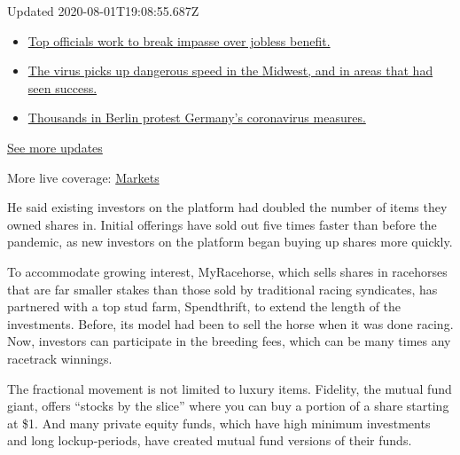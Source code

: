 Updated 2020-08-01T19:08:55.687Z

\begin{itemize}
\tightlist
\item
  \href{https://www.nytimes3xbfgragh.onion/2020/08/01/world/coronavirus-covid-19.html?action=click\&pgtype=Article\&state=default\&region=MAIN_CONTENT_1\&context=storylines_live_updates\#link-3ac56579}{Top
  officials work to break impasse over jobless benefit.}
\item
  \href{https://www.nytimes3xbfgragh.onion/2020/08/01/world/coronavirus-covid-19.html?action=click\&pgtype=Article\&state=default\&region=MAIN_CONTENT_1\&context=storylines_live_updates\#link-8796723}{The
  virus picks up dangerous speed in the Midwest, and in areas that had
  seen success.}
\item
  \href{https://www.nytimes3xbfgragh.onion/2020/08/01/world/coronavirus-covid-19.html?action=click\&pgtype=Article\&state=default\&region=MAIN_CONTENT_1\&context=storylines_live_updates\#link-25930521}{Thousands
  in Berlin protest Germany's coronavirus measures.}
\end{itemize}

\href{https://www.nytimes3xbfgragh.onion/2020/08/01/world/coronavirus-covid-19.html?action=click\&pgtype=Article\&state=default\&region=MAIN_CONTENT_1\&context=storylines_live_updates}{See
more updates}

More live coverage:
\href{https://www.nytimes3xbfgragh.onion/live/2020/07/31/business/stock-market-today-coronavirus?action=click\&pgtype=Article\&state=default\&region=MAIN_CONTENT_1\&context=storylines_live_updates}{Markets}

He said existing investors on the platform had doubled the number of
items they owned shares in. Initial offerings have sold out five times
faster than before the pandemic, as new investors on the platform began
buying up shares more quickly.

To accommodate growing interest, MyRacehorse, which sells shares in
racehorses that are far smaller stakes than those sold by traditional
racing syndicates, has partnered with a top stud farm, Spendthrift, to
extend the length of the investments. Before, its model had been to sell
the horse when it was done racing. Now, investors can participate in the
breeding fees, which can be many times any racetrack winnings.

The fractional movement is not limited to luxury items. Fidelity, the
mutual fund giant, offers ``stocks by the slice'' where you can buy a
portion of a share starting at \$1. And many private equity funds, which
have high minimum investments and long lockup-periods, have created
mutual fund versions of their funds.

